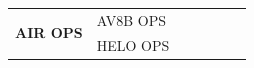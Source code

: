 \documentclass[a4paper,landscape,final,8pt]{beamer} %
\begin{document}
\begin{textblock*}{25cm}
{\begin{tabular}{|p{2.8cm}|p{3.4cm}|c|c|c|c|c|}
\multirow{2}{*}{\cellcolor{gray!20}\textbf{AIR OPS}}
 & AV8B OPS
 & \cellcolor{\csname STOVLa06a1aC\endcsname}{\csname STOVLa06a1aT\endcsname}
 & \cellcolor{\csname STOVLa12aC\endcsname}{\csname STOVLa12aT\endcsname}
 & \cellcolor{\csname STOVLa18aC\endcsname}{\csname STOVLa18aT\endcsname}
 & \cellcolor{\csname STOVLa00aC\endcsname}{\csname STOVLa00aT\endcsname}
 & \cellcolor{\csname STOVLa06a2aC\endcsname}{\csname STOVLa06a2aT\endcsname} \\
\hhline{|~|-|-|-|-|-|-|}  %
 & HELO OPS
 & \cellcolor{\csname HELOa06a1aC\endcsname}{\csname HELOa06a1aT\endcsname}
 & \cellcolor{\csname HELOa12aC\endcsname}{\csname HELOa12aT\endcsname}
 & \cellcolor{\csname HELOa18aC\endcsname}{\csname HELOa18aT\endcsname}
 & \cellcolor{\csname HELOa00aC\endcsname}{\csname HELOa00aT\endcsname}
 & \cellcolor{\csname HELOa06a2aC\endcsname}{\csname HELOa06a2aT\endcsname} \\
\hline

\end{tabular}
}
\end{textblock*}
\end{document}
